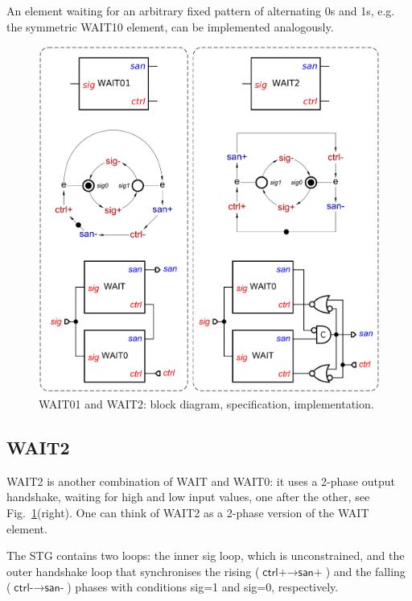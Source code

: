 \documentclass[conference]{IEEEtran}
\begin{document}
An element waiting for an arbitrary fixed pattern of alternating 0s and 1s, e.g.
the symmetric \textsf{WAIT10} element, can be implemented analogously.

\begin{figure}
\begin{center}
    \includegraphics[scale=0.23]{fig/WAIT01-and-WAIT2.pdf}
    \caption{\textsf{WAIT01} and \textsf{WAIT2}: block diagram,
    specification, implementation.}
    \label{fig:wait012}
    \vspace{-7mm}
\end{center}
\end{figure}

\subsection*{\textsf{WAIT2}}

\textsf{WAIT2} is another combination of \textsf{WAIT} and \textsf{WAIT0}:
it uses a 2-phase output handshake, waiting for high and low input values, one after
the other, see Fig.~\ref{fig:wait012}(right). One can think of \textsf{WAIT2} as a 2-phase
version of the \textsf{WAIT} element.

The STG contains two loops: the inner \textsf{sig} loop, which is unconstrained, and
the outer handshake loop that synchronises the rising
($\textsf{ctrl+} \longrightarrow \textsf{san+}$)
 and the falling
($\textsf{ctrl-} \longrightarrow \textsf{san-}$)
phases with conditions \textsf{sig=1} and \textsf{sig=0}, respectively.
\end{document}
